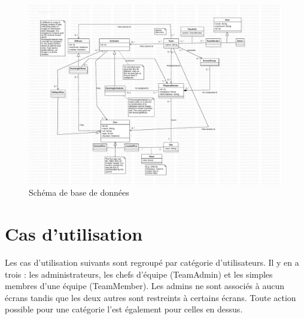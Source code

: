\documentclass[french]{article}
\begin{document}
	\begin{figure}[h]
		\centering
		\includegraphics[scale=0.5]{db_schema}
		\caption{Schéma de base de données}
	\end{figure}
	
	
\newpage	

	
\section{Cas d'utilisation}
Les cas d'utilisation suivants sont regroupé par catégorie d'utilisateurs. Il y en a trois : les administrateurs, les chefs d'équipe (TeamAdmin) et les simples membres d'une équipe (TeamMember). Les admins ne sont associés à aucun écrans tandis que les deux autres sont restreints à certains écrans.
Toute action possible pour une catégorie l'est également pour celles en dessus. 
\end{document}
